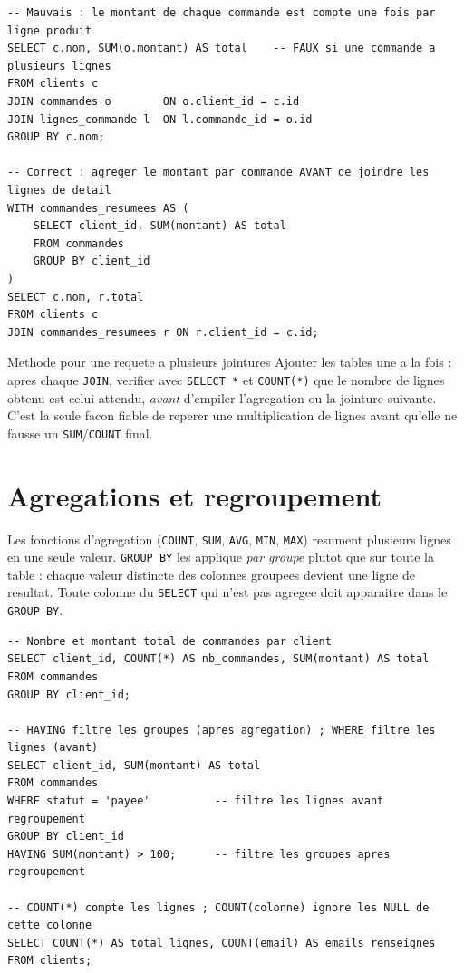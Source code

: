 \documentclass[11pt,a4paper]{article}
\begin{document}
\begin{lstlisting}
-- Mauvais : le montant de chaque commande est compte une fois par ligne produit
SELECT c.nom, SUM(o.montant) AS total    -- FAUX si une commande a plusieurs lignes
FROM clients c
JOIN commandes o        ON o.client_id = c.id
JOIN lignes_commande l  ON l.commande_id = o.id
GROUP BY c.nom;

-- Correct : agreger le montant par commande AVANT de joindre les lignes de detail
WITH commandes_resumees AS (
    SELECT client_id, SUM(montant) AS total
    FROM commandes
    GROUP BY client_id
)
SELECT c.nom, r.total
FROM clients c
JOIN commandes_resumees r ON r.client_id = c.id;
\end{lstlisting}

\begin{infobox}{Methode pour une requete a plusieurs jointures}
Ajouter les tables une a la fois : apres chaque \texttt{JOIN}, verifier avec
\texttt{SELECT *} et \texttt{COUNT(*)} que le nombre de lignes obtenu est
celui attendu, \emph{avant} d'empiler l'agregation ou la jointure suivante.
C'est la seule facon fiable de reperer une multiplication de lignes avant
qu'elle ne fausse un \texttt{SUM}/\texttt{COUNT} final.
\end{infobox}

\section{Agregations et regroupement}
Les fonctions d'agregation (\texttt{COUNT}, \texttt{SUM}, \texttt{AVG},
\texttt{MIN}, \texttt{MAX}) resument plusieurs lignes en une seule valeur.
\texttt{GROUP BY} les applique \emph{par groupe} plutot que sur toute la table :
chaque valeur distincte des colonnes groupees devient une ligne de resultat.
Toute colonne du \texttt{SELECT} qui n'est pas agregee doit apparaitre dans le
\texttt{GROUP BY}.

\begin{lstlisting}
-- Nombre et montant total de commandes par client
SELECT client_id, COUNT(*) AS nb_commandes, SUM(montant) AS total
FROM commandes
GROUP BY client_id;

-- HAVING filtre les groupes (apres agregation) ; WHERE filtre les lignes (avant)
SELECT client_id, SUM(montant) AS total
FROM commandes
WHERE statut = 'payee'          -- filtre les lignes avant regroupement
GROUP BY client_id
HAVING SUM(montant) > 100;      -- filtre les groupes apres regroupement

-- COUNT(*) compte les lignes ; COUNT(colonne) ignore les NULL de cette colonne
SELECT COUNT(*) AS total_lignes, COUNT(email) AS emails_renseignes
FROM clients;
\end{lstlisting}
\end{document}
